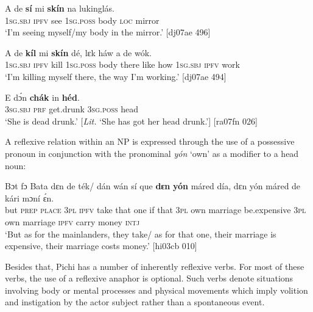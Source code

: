 \ea%
    \label{ex:key:1226}
    \gll \MakeUppercase{A}   de  \textbf{sí}  mi    \textbf{skín}    na  lukinglás.\\
\textsc{1sg.sbj}  \textsc{ipfv}  see  \textsc{1sg.poss}  body  \textsc{loc}  mirror\\

\glt ‘I’m seeing myself/my body in the mirror.’ [dj07ae 496]
\z


\ea%
    \label{ex:key:1227}
    \gll \MakeUppercase{A}   de  \textbf{kíl}  mi    \textbf{skín}    dé,    lɛk  háw    a    de  wók.\\
\textsc{1sg.sbj}  \textsc{ipfv}  kill  \textsc{1sg.poss}  body  there  like  how    \textsc{1sg.sbj}  \textsc{ipfv}  work\\

\glt ‘I’m killing myself there, the way I’m working.’ [dj07ae 494]
\z


\ea%
    \label{ex:key:1228}
    \gll E    dɔ́n  \textbf{chák}    in    \textbf{héd}.\\
\textsc{3sg.sbj}  \textsc{prf}  get.drunk  \textsc{3sg.poss}  head\\

\glt ‘She is dead drunk.’ [\textit{Lit.} ‘She has got her head drunk.’] [ra07fn 026]
\z

A reflexive relation within an \textsc{NP} is expressed through the use of a possessive pronoun in conjunction with the pronominal \textit{yón} ‘own’ as a modifier to a head noun: 


\ea%
    \label{ex:key:1229}
    \gll Bɔt  fɔ  Bata    dɛn  de  ték/    dán    wán  sí  que  \textbf{dɛn}  \textbf{yón}   máred
día,      dɛn    yón     máred    de  kári    mɔní  ɛ́n.\\
but  \textsc{prep}  \textsc{place}  \textsc{3pl}  \textsc{ipfv}  take    that    one  if  that  \textsc{3pl}  own  marriage
be.expensive  \textsc{3pl}    own    marriage    \textsc{ipfv}  carry  money  \textsc{intj}\\

\glt ‘But as for the mainlanders, they take/ as for that one, their marriage is 
expensive, their marriage costs money.’ [hi03cb 010]
\z

Besides that, Pichi has a number of inherently reflexive verbs. For most of these verbs, the use of a reflexive anaphor is optional. Such verbs denote situations involving body or mental processes and physical movements which imply volition and instigation by the actor subject rather than a spontaneous event. 


